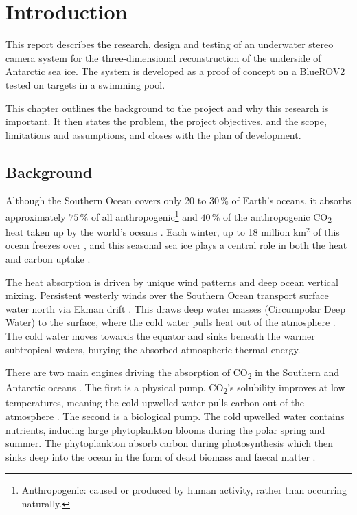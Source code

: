 \chapter{Introduction}
\label{ch:introduction}
This report describes the research, design and testing of an underwater stereo camera system for the
three-dimensional reconstruction of the underside of Antarctic sea ice. The system is developed as a proof of concept
on a BlueROV2 tested on targets in a swimming pool.

This chapter outlines the background to the project and why this research is important. It then states the
problem, the project objectives, and the scope, limitations and assumptions, and closes with the plan of development.

\section{Background}
\label{sec:ch1.background}


Although the Southern Ocean 
covers only 20 to 30\,\% of Earth's oceans, 
it absorbs approximately $75\,\%$ of all anthropogenic\footnote{Anthropogenic: caused or produced by human activity, rather than occurring naturally.} and $40\,\%$ of the anthropogenic CO\textsubscript{2} 
 heat taken up by the world's oceans \cite{kennicuttSustainedAntarcticResearch2019}. Each winter, up to 18 million km$^2$ of this ocean
  freezes over \cite{parkinson40yRecordReveals2019}, and this seasonal sea ice plays a central role in both the heat and carbon uptake \cite{rysgaardSeaIceContribution2011}.

The heat absorption is driven by unique wind patterns and deep ocean vertical mixing.
Persistent westerly winds over the Southern Ocean transport surface water north via Ekman drift \cite{Circulation}. This draws deep water masses (Circumpolar Deep Water) 
to the surface, where the cold water pulls heat out of the atmosphere \cite{armourSouthernOceanWarming2016}.
The cold  water moves towards the equator and sinks beneath the warmer subtropical waters, burying the
absorbed atmospheric thermal energy.

There are two main engines driving the absorption of CO\textsubscript{2} in the Southern and Antarctic oceans \cite{gruberOceanicSinkAnthropogenic2019,kennicuttSustainedAntarcticResearch2019}.
The first is a physical pump. CO\textsubscript{2}'s solubility improves at low temperatures, meaning the cold upwelled water pulls carbon out of the atmosphere \cite{gruberOceanicSinkAnthropogenic2019}.
The second is a biological pump. The cold upwelled water contains nutrients, inducing large phytoplankton blooms during
the polar spring and summer. The phytoplankton absorb carbon during photosynthesis which then sinks deep into the ocean in the form of dead biomass and faecal matter \cite{kennicuttSustainedAntarcticResearch2019}.

